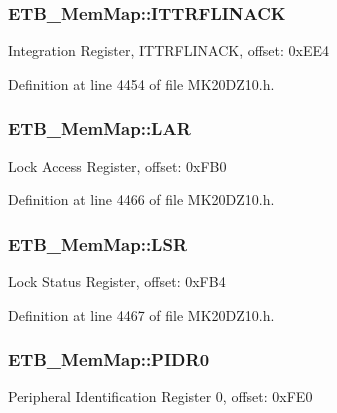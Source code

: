 \subsubsection[{\texorpdfstring{I\+T\+T\+R\+F\+L\+I\+N\+A\+CK}{ITTRFLINACK}}]{ E\+T\+B\+\_\+\+Mem\+Map\+::\+I\+T\+T\+R\+F\+L\+I\+N\+A\+CK}\hypertarget{struct_e_t_b___mem_map_a136987669379af39a12062922fee39b1}{}\label{struct_e_t_b___mem_map_a136987669379af39a12062922fee39b1}
Integration Register, I\+T\+T\+R\+F\+L\+I\+N\+A\+CK, offset\+: 0x\+E\+E4 

Definition at line 4454 of file M\+K20\+D\+Z10.\+h.

\subsubsection[{\texorpdfstring{L\+AR}{LAR}}]{ E\+T\+B\+\_\+\+Mem\+Map\+::\+L\+AR}\hypertarget{struct_e_t_b___mem_map_ae5221e565fed13a5f544c207c5f18843}{}\label{struct_e_t_b___mem_map_ae5221e565fed13a5f544c207c5f18843}
Lock Access Register, offset\+: 0x\+F\+B0 

Definition at line 4466 of file M\+K20\+D\+Z10.\+h.

\subsubsection[{\texorpdfstring{L\+SR}{LSR}}]{ E\+T\+B\+\_\+\+Mem\+Map\+::\+L\+SR}\hypertarget{struct_e_t_b___mem_map_a92be1954eec6c20cefd3f7a2ea2fc2b7}{}\label{struct_e_t_b___mem_map_a92be1954eec6c20cefd3f7a2ea2fc2b7}
Lock Status Register, offset\+: 0x\+F\+B4 

Definition at line 4467 of file M\+K20\+D\+Z10.\+h.

\subsubsection[{\texorpdfstring{P\+I\+D\+R0}{PIDR0}}]{ E\+T\+B\+\_\+\+Mem\+Map\+::\+P\+I\+D\+R0}\hypertarget{struct_e_t_b___mem_map_a7cca8cc873dc51b739a8f2a26b01cd22}{}\label{struct_e_t_b___mem_map_a7cca8cc873dc51b739a8f2a26b01cd22}
Peripheral Identification Register 0, offset\+: 0x\+F\+E0 

